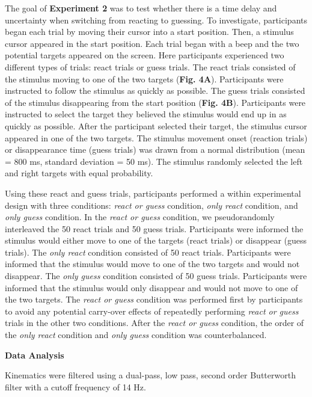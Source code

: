 \documentclass[12pt]{article}
\newcommand\boldblue[1]{\textcolor{mydarkblue}{\textbf{#1}}}
\begin{document}
\noindent The goal of \boldblue{Experiment 2} was to test whether there is a time delay and uncertainty when switching from reacting to guessing. To investigate, participants began each trial by moving their cursor into a start position. Then, a stimulus cursor appeared in the start position. Each trial began with a beep and the two potential targets appeared on the screen. Here participants experienced two different types of trials: react trials or guess trials. The react trials consisted of the stimulus moving to one of the two targets (\boldblue{Fig. 4A}). Participants were instructed to follow the stimulus as quickly as possible. The guess trials consisted of the stimulus disappearing from the start position (\boldblue{Fig. 4B}). Participants were instructed to select the target they believed the stimulus would end up in as quickly as possible. After the participant selected their target, the stimulus cursor appeared in one of the two targets. The stimulus movement onset (reaction trials) or disappearance time (guess trials) was drawn from a normal distribution (mean = 800 ms, standard deviation = 50 ms).  The stimulus randomly selected the left and right targets with equal probability.

Using these react and guess trials, participants performed a within experimental design with three conditions: \emph{react or guess} condition, \emph{only react} condition, and \emph{only guess} condition. In the \emph{react or guess} condition, we pseudorandomly interleaved the 50 react trials and 50 guess trials. Participants were informed the stimulus would either move to one of the targets (react trials) or disappear (guess trials). The \emph{only react} condition consisted of 50 react trials. Participants were informed that the stimulus would move to one of the two targets and would not disappear. The \emph{only guess} condition consisted of 50 guess trials. Participants were informed that the stimulus would only disappear and would not move to one of the two targets. The \emph{react or guess} condition was performed first by participants to avoid any potential carry-over effects of repeatedly performing \emph{react or guess} trials in the other two conditions. After the \emph{react or guess} condition, the order of the \emph{only react} condition and \emph{only guess} condition was counterbalanced.

\vspace{2mm}
\noindent\boldblue{\large{Data Analysis}}

\noindent Kinematics were filtered using a dual-pass, low pass, second order Butterworth filter with a cutoff frequency of 14 Hz.
\end{document}
